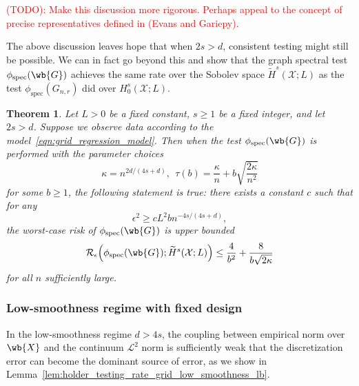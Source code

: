 \documentclass{article}
\newcommand{\1}{\mathbf{1}}
\newcommand{\Xset}{\mathcal{X}}
\newcommand{\Leb}{\mathcal{L}}
\newcommand{\wt}[1]{\widetilde{#1}}
\newcommand{\spec}{\mathrm{spec}}
\theoremstyle{alden}
\theoremstyle{aldenthm}
\newtheorem{theorem}{Theorem}
\theoremstyle{definition}
\theoremstyle{remark}
\begin{document}
\textcolor{red}{(TODO): Make this discussion more rigorous. Perhaps appeal to the concept of precise representatives defined in (Evans and Gariepy).}

The above discussion leaves hope that when $2s > d$, consistent testing might still be possible. We can in fact go beyond this and show that the graph spectral test $\phi_{\spec}(\wb{G})$ achieves the same rate over the Sobolev space $\wt{H}^s(\Xset;L)$ as the test $\phi_{\spec}(G_{n,r})$ did over $H_0^s(\Xset;L)$.

\begin{theorem}
	\label{thm:sobolev_testing_rate_grid}
	Let $L > 0$ be a fixed constant, $s \geq 1$ be a fixed integer, and let $2s > d$.  Suppose we observe data according to the model~\eqref{eqn:grid_regression_model}. Then when the test $\phi_{\spec}(\wb{G})$ is performed with the parameter choices
	\begin{equation*}
	\kappa = n^{2d/(4s + d)},~~ \tau(b) =  \frac{\kappa}{n} + b\sqrt{\frac{2\kappa}{n^2}}
	\end{equation*} 
	for some $b \geq 1$, the following statement is true: there exists a constant $c$ such that for any
	\begin{equation*}
	\epsilon^2 \geq c L^2 b n^{-4s/(4s + d)},
	\end{equation*}
	the worst-case risk of $\phi_{\spec}(\wb{G})$ is upper bounded
	\begin{equation}
	\label{eqn:sobolev_testing_rate_grid_1}
	\mathcal{R}_{\epsilon}\Bigl(\phi_{\spec}(\wb{G});\wt{H}^s(\Xset;L)\Bigr) \leq \frac{4}{b^2} + \frac{8}{b\sqrt{2\kappa}}
	\end{equation}
	for all $n$ sufficiently large.
\end{theorem}

\subsubsection{Low-smoothness regime with fixed design}
In the low-smoothness regime $d > 4s$, the coupling between empirical norm over $\wb{X}$ and the continuum $\Leb^2$ norm is sufficiently weak that the discretization error can become the dominant source of error, as we show in Lemma~\ref{lem:holder_testing_rate_grid_low_smoothness_lb}.
\end{document}
